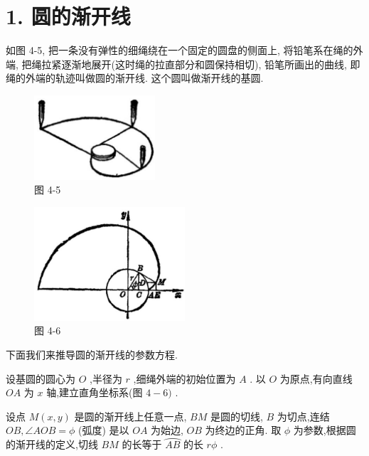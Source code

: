 \documentclass[lang=cn,newtx,10.5pt,scheme=chinese]{elegantbook}
\begin{document}
\section*{1. 圆的渐开线}

如图 4-5, 把一条没有弹性的细绳绕在一个固定的圆盘的侧面上, 将铅笔系在绳的外端, 把绳拉紧逐渐地展开(这时绳的拉直部分和圆保持相切), 铅笔所画出的曲线, 即绳的外端的轨迹叫做圆的渐开线. 这个圆叫做渐开线的基圆.

\begin{figure}[h]
  \centering
  \includegraphics[max width=0.4\textwidth]{images/01912cc2-ffb6-728e-9ae7-b113ff05c64b_167_188524.jpg}
  \caption{图 4-5}
\end{figure}



\begin{figure}[h]
  \centering
  \includegraphics[max width=0.5\textwidth]{images/01912cc2-ffb6-728e-9ae7-b113ff05c64b_167_197390.jpg}
  \caption{图 4-6}
\end{figure}



下面我们来推导圆的渐开线的参数方程.

设基圆的圆心为 \(O\) ,半径为 \(r\) ,细绳外端的初始位置为 \(A\) . 以 \(O\) 为原点,有向直线 \({OA}\) 为 \(x\) 轴,建立直角坐标系(图 \(4 - 6)\) .

设点 \(M\left( {x,y}\right)\) 是圆的渐开线上任意一点, \({BM}\) 是圆的切线, \(B\) 为切点,连结 \({OB},\angle {AOB} = \phi\) (弧度) 是以 \({OA}\) 为始边, \({OB}\) 为终边的正角. 取 \(\phi\) 为参数,根据圆的渐开线的定义,切线 \({BM}\) 的长等于 \(\overset{⏜}{AB}\) 的长 \({r\phi }\) .
\end{document}
